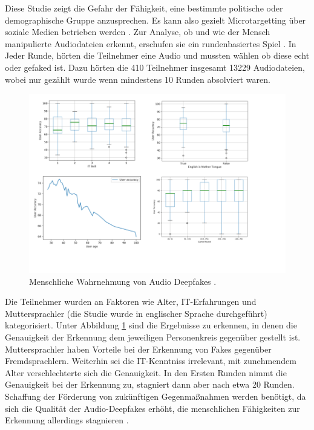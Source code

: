 Diese Studie zeigt die Gefahr der Fähigkeit, eine bestimmte politische oder demographische Gruppe anzusprechen.
Es kann also gezielt Microtargetting über soziale Medien betrieben werden \citep[Vgl.][]{Hancock2021}.
\newpage
Zur Analyse, ob und wie der Mensch manipulierte Audiodateien erkennt, erschufen sie ein rundenbasiertes Spiel \citep[][]{Mueller2022}.
In Jeder Runde, hörten die Teilnehmer eine Audio und mussten wählen ob diese echt oder gefaked ist.
Dazu hörten die 410 Teilnehmer insgesamt 13229 Audiodateien, wobei nur gezählt wurde wenn mindestens 10 Runden absolviert waren.
\par
\begin{figure}[h]
 \centering
 \includegraphics{Assets/ResultsHumanDetectionDeepFake.png}
 \caption{Menschliche Wahrnehmung von Audio Deepfakes \citep[][]{Mueller2022}.}
 \label{fig:ResultsDetectionDeepfake}
\end{figure}
Die Teilnehmer wurden an Faktoren wie Alter, IT-Erfahrungen und Muttersprachler (die Studie wurde in englischer Sprache durchgeführt) kategorisiert.
Unter Abbildung \ref{fig:ResultsDetectionDeepfake} sind die Ergebnisse zu erkennen, in denen die Genauigkeit der Erkennung dem jeweiligen Personenkreis gegenüber gestellt ist.
Muttersprachler haben Vorteile bei der Erkennung von Fakes gegenüber Fremdsprachlern.
Weiterhin sei die IT-Kenntniss irrelevant, mit zunehmendem Alter verschlechterte sich die Genauigkeit. 
In den Ersten Runden nimmt die Genauigkeit bei der Erkennung zu, stagniert dann aber nach etwa 20 Runden.
Schaffung der Förderung von zukünftigen Gegenmaßnahmen werden benötigt, da sich die Qualität der Audio-Deepfakes erhöht, die menschlichen Fähigkeiten zur Erkennung allerdings stagnieren \citep[][]{Mueller2022}.
